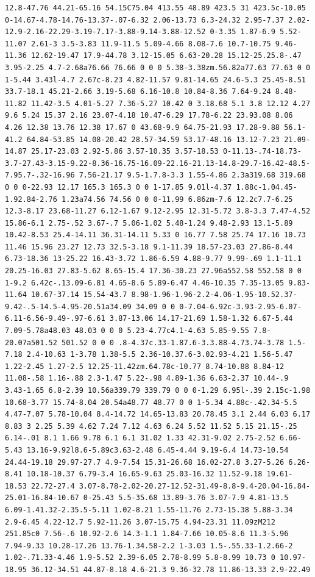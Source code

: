 \documentclass[11pt]{article}
\begin{document}
\begin{enumerate}
\begin{verbatim}
12.8-47.76 44.21-65.16 54.15C75.04 413.55 48.89 423.5 31 423.5c-10.05 0-14.67-4.78-14.76-13.37-.07-6.32 2.06-13.73 6.3-24.32 2.95-7.37 2.02-12.9-2.16-22.29-3.19-7.17-3.88-9.14-3.88-12.52 0-3.35 1.87-6.9 5.52-11.07 2.61-3 3.5-3.83 11.9-11.5 5.09-4.66 8.08-7.6 10.7-10.75 9.46-11.36 12.62-19.47 17.9-44.78 3.12-15.05 6.63-20.28 15.12-25.25.8-.47 3.95-2.25 4.7-2.68a76.66 76.66 0 0 0 5.38-3.38zm.56.82a77.63 77.63 0 0 1-5.44 3.43l-4.7 2.67c-8.23 4.82-11.57 9.81-14.65 24.6-5.3 25.45-8.51 33.7-18.1 45.21-2.66 3.19-5.68 6.16-10.8 10.84-8.36 7.64-9.24 8.48-11.82 11.42-3.5 4.01-5.27 7.36-5.27 10.42 0 3.18.68 5.1 3.8 12.12 4.27 9.6 5.24 15.37 2.16 23.07-4.18 10.47-6.29 17.78-6.22 23.93.08 8.06 4.26 12.38 13.76 12.38 17.67 0 43.68-9.9 64.75-21.93 17.28-9.88 56.1-41.2 64.84-53.85 14.08-20.42 28.57-34.59 53.17-48.16 13.12-7.23 21.09-14.87 25.17-23.03 2.92-5.86 3.57-10.35 3.57-18.53 0-11.13-.74-18.73-3.7-27.43-3.15-9.22-8.36-16.75-16.09-22.16-21.13-14.8-29.7-16.42-48.5-7.95.7-.32-16.96 7.56-21.17 9.5-1.7.8-3.3 1.55-4.86 2.3a319.68 319.68 0 0 0-22.93 12.17 165.3 165.3 0 0 1-17.85 9.01l-4.37 1.88c-1.04.45-1.92.84-2.76 1.23a74.56 74.56 0 0 0-11.99 6.86zm-7.6 12.2c7.7-6.25 12.3-8.17 23.68-11.27 6.12-1.67 9.12-2.95 12.31-5.72 3.8-3.3 7.47-4.52 15.86-6.1 2.75-.52 3.67-.7 5.06-1.02 5.48-1.24 9.48-2.93 13.1-5.89 10.42-8.53 25.4-14.11 36.31-14.11 5.33 0 16.77 7.58 25.74 17.16 10.73 11.46 15.96 23.27 12.73 32.5-3.18 9.1-11.39 18.57-23.03 27.86-8.44 6.73-18.36 13-25.22 16.43-3.72 1.86-6.59 4.88-9.77 9.99-.69 1.1-11.1 20.25-16.03 27.83-5.62 8.65-15.4 17.36-30.23 27.96a552.58 552.58 0 0 1-9.2 6.42c-.13.09-6.81 4.65-8.6 5.89-6.47 4.46-10.35 7.35-13.05 9.83-11.64 10.67-37.14 15.54-43.7 8.98-1.96-1.96-2.2-4.06-1.95-10.52.37-9.42-.5-14.5-4.95-20.51a34.09 34.09 0 0 0-7.04-6.92c-3.93-2.95-6.07-6.11-6.56-9.49-.97-6.61 3.87-13.06 14.17-21.69 1.58-1.32 6.67-5.44 7.09-5.78a48.03 48.03 0 0 0 5.23-4.77c4.1-4.63 5.85-9.55 7.8-20.07a501.52 501.52 0 0 0 .8-4.37c.33-1.87.6-3.3.88-4.73.74-3.78 1.5-7.18 2.4-10.63 1-3.78 1.38-5.5 2.36-10.37.6-3.02.93-4.21 1.56-5.47 1.22-2.45 1.27-2.5 12.25-11.42zm.64.78c-10.77 8.74-10.88 8.84-12 11.08-.58 1.16-.88 2.3-1.47 5.22-.98 4.89-1.36 6.63-2.37 10.44-.9 3.43-1.65 6.8-2.39 10.56a339.79 339.79 0 0 0-1.29 6.95l-.39 2.15c-1.98 10.68-3.77 15.74-8.04 20.54a48.77 48.77 0 0 1-5.34 4.88c-.42.34-5.5 4.47-7.07 5.78-10.04 8.4-14.72 14.65-13.83 20.78.45 3.1 2.44 6.03 6.17 8.83 3 2.25 5.39 4.62 7.24 7.12 4.63 6.24 5.52 11.52 5.15 21.15-.25 6.14-.01 8.1 1.66 9.78 6.1 6.1 31.02 1.33 42.31-9.02 2.75-2.52 6.66-5.43 13.16-9.92l8.6-5.89c3.63-2.48 6.45-4.44 9.19-6.4 14.73-10.54 24.44-19.18 29.97-27.7 4.9-7.54 15.31-26.68 16.02-27.8 3.27-5.26 6.26-8.41 10.18-10.37 6.79-3.4 16.65-9.63 25.03-16.32 11.52-9.18 19.61-18.53 22.72-27.4 3.07-8.78-2.02-20.27-12.52-31.49-8.8-9.4-20.04-16.84-25.01-16.84-10.67 0-25.43 5.5-35.68 13.89-3.76 3.07-7.9 4.81-13.5 6.09-1.41.32-2.35.5-5.11 1.02-8.21 1.55-11.76 2.73-15.38 5.88-3.34 2.9-6.45 4.22-12.7 5.92-11.26 3.07-15.75 4.94-23.31 11.09zM212 251.85c0 7.56-.6 10.92-2.6 14.3-1.1 1.84-7.66 10.05-8.6 11.3-5.96 7.94-9.33 10.28-17.26 13.76-1.34.58-2.2 1-3.03 1.5-.55.33-1.2.66-2 1.02-.71.33-4.46 1.9-5.52 2.39-6.05 2.78-8.99 5.8-8.99 10.73 0 10.97-18.95 36.12-34.51 44.87-8.18 4.6-21.3 9.36-32.78 11.86-13.33 2.9-22.49 
\end{verbatim}
\end{enumerate}
\end{document}
